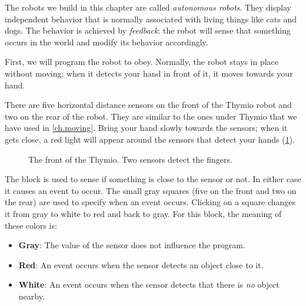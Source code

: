 
\label{ch.pet}

The robots we build in this chapter are called \emph{autonomous robots}.
They display independent behavior that is normally associated with
living things like cats and dogs. The behavior is achieved by
\textit{feedback}: the robot will sense that something occurs in the
world and modify its behavior accordingly.


First, we will program the robot to obey. Normally, the robot stays in
place without moving; when it detects your hand in front of it, it
moves towards your hand.

There are five horizontal distance sensors on the front of the Thymio
robot and two on the rear of the robot.
They are similar to the ones under Thymio that we have used in \cref{ch.moving}.
Bring your hand slowly towards the
sensors; when it gets close, a red light will appear around the sensors
that detect your hands (\cref{fig.detect}).

\begin{figure}
\begin{center}
\caption{The front of the Thymio. Two sensors detect the fingers.}\label{fig.detect}
\end{center}
\end{figure}

The block  is used to sense if something is close to the
sensor or not. In either case it causes an event to occur. The small
gray squares (five on the front and two on the rear) are used to specify
when an event occurs. Clicking on a square changes it from gray to
white to red and back to gray.
For this block, the meaning of these colors is:

\begin{itemize}
\item \textbf{Gray}: The value of the sensor does not influence the
program.
\item \textbf{Red}: An event occurs when the sensor detects an object
close to it.
\item \textbf{White}: An event occurs when the sensor detects that there
is \emph{no} object nearby.
\end{itemize}

